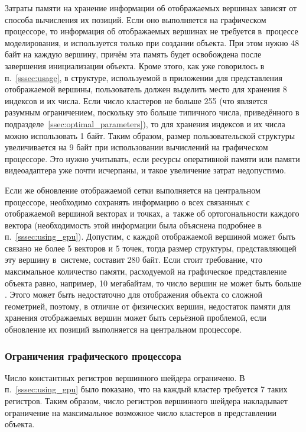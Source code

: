 \documentclass[a4paper, 14pt, titlepage]{extarticle}
\newcommand{\num}[1]{\numprint{#1}}
\begin{document}
        Затраты памяти на хранение информации об отображаемых вершинах зависят от способа вычисления
        их позиций. Если оно выполняется на графическом процессоре, то информация об отображаемых
        вершинах не требуется в~процессе моделирования, и используется только при создании объекта.
        При этом нужно 48 байт на каждую вершину, причём эта память будет освобождена после
        завершения инициализации объекта. Кроме этого, как уже говорилось в п.~\ref{sssec:usage},
        в структуре, используемой в приложении для представления отображаемой вершины, пользователь
        должен выделить место для хранения 8 индексов и их числа. Если число кластеров не больше
        255 (что является разумным ограничением, поскольку это больше типичного числа, приведённого
        в подразделе~\ref{ssec:optimal_parameters}),
        то для хранения индексов и их числа можно использовать 1 байт. Таким образом,
        размер пользовательской структуры увеличивается на 9 байт при использовании вычислений на
        графическом процессоре. Это нужно учитывать, если ресурсы оперативной памяти или памяти
        видеоадаптера уже почти исчерпаны, и такое увеличение затрат недопустимо.

        Если же обновление отображаемой сетки выполняется на центральном процессоре, необходимо
        сохранять информацию о всех связанных с отображаемой вершиной векторах и точках, а~также об
        ортогональности каждого вектора (необходимость этой информации была объяснена подробнее в
        п.~\ref{sssec:using_gpu}). Допустим, с каждой отображаемой вершиной может быть связано
        не более 5 векторов и 5 точек, тогда размер структуры, представляющей эту вершину в~системе,
        составит 280 байт. Если стоит требование, что максимальное количество памяти, расходуемой на
        графическое представление объекта равно, например, 10 мегабайтам, то число вершин не может
        быть больше \num{35714}. Этого может быть недостаточно для отображения объекта со сложной
        геометрией, поэтому, в отличие от физических вершин, недостаток памяти для хранения
        отображаемых вершин может быть серьёзной проблемой, если обновление их позиций выполняется
        на центральном процессоре.

      \subsubsection{Ограничения графического процессора}

        Число константных регистров вершинного шейдера ограничено. В п.~\ref{sssec:using_gpu} было
        показано, что на каждый кластер требуется 7 таких регистров. Таким образом, число регистров
        вершинного шейдера накладывает ограничение на максимальное возможное число кластеров в
        представлении объекта.
\end{document}
